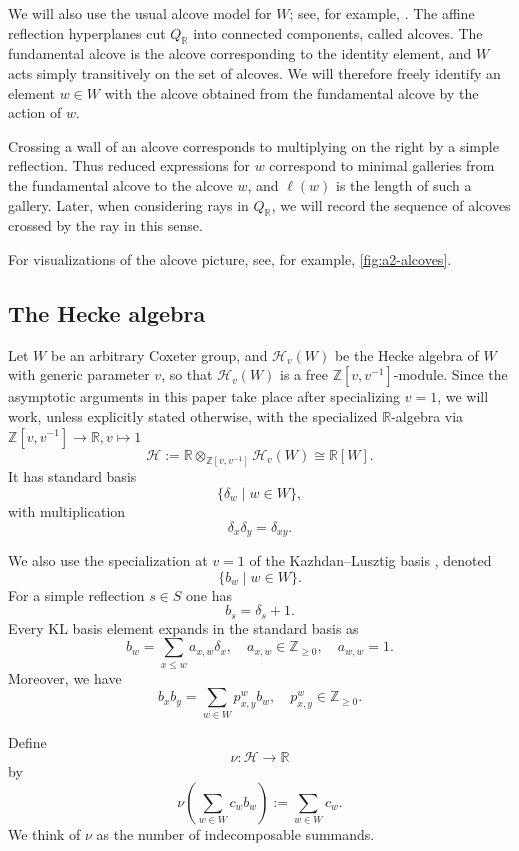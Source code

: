 \documentclass[a4paper,11pt]{amsart}
\newcommand{\R}{\mathbb{R}}
\newcommand{\N}{\mathbb{Z}_{\geq 0}}
\newcommand{\Z}{\mathbb{Z}}
\newcommand{\ra}{\rightarrow}
\newcommand{\Hecke}{\mc H}
\newcommand{\mc}{\mathcal}
\numberwithin{equation}{subsection}
\theoremstyle{definition}
\theoremstyle{remark}
\begin{document}
We will also use the usual alcove model for $W$; see, for example,
\cite[\S 4.3]{Hu-coxeter}. The affine reflection hyperplanes cut
$Q_\R$ into connected components, called alcoves. The fundamental alcove is
the alcove corresponding to the identity element, and $W$ acts simply
transitively on the set of alcoves. We will therefore freely identify an
element $w\in W$ with the alcove obtained from the fundamental alcove by the
action of $w$.

Crossing a wall of an alcove corresponds to multiplying on the right by a
simple reflection. Thus reduced expressions for $w$ correspond to minimal
galleries from the fundamental alcove to the alcove $w$, and $\ell(w)$ is the
length of such a gallery. Later, when considering rays in $Q_\R$, we will
record the sequence of alcoves crossed by the ray in this sense.

\begin{Example}
For visualizations of the alcove picture, see, for example,
\autoref{fig:a2-alcoves}.
\end{Example}

\subsection{The Hecke algebra}\label{secke:Hecke}
Let $W$ be an arbitrary Coxeter group, and $\Hecke_v(W)$ be the Hecke algebra of $W$ with generic parameter $v$, so that $\Hecke_v(W)$ is a free $\Z[v,v^{-1}]$-module.
Since the asymptotic arguments in this paper take place after specializing
$v=1$, we will work, unless explicitly stated otherwise, with the
specialized $\R$-algebra via $\Z[v,v^{-1}]\to\R,v\mapsto 1$
\[
\Hecke:=\R\otimes_{\Z[v,v^{-1}]}\Hecke_v(W)\cong \R [W].
\]
It has standard basis
\[
\{\delta_w\mid w\in W\},
\]
with multiplication
\[
\delta_x\delta_y=\delta_{xy}.
\]

We also use the specialization at $v=1$ of the Kazhdan--Lusztig basis \cite{KaLu-coxeter-hecke},
denoted
\[
\{b_w\mid w\in W\}.
\]
For a simple reflection $s\in S$ one has
\[
b_s=\delta_s+1.
\]
Every KL basis element expands in the standard basis as
\[
b_w=\sum_{x\leq w} a_{x,w}\delta_x,
\quad
a_{x,w}\in\N,
\quad
a_{w,w}=1.
\]
Moreover, we have
\[
b_xb_y=\sum_{w\in W} p_{x,y}^w b_w,\quad p_{x,y}^w\in\N.
\]


\begin{Definition}
Define
\[
\nu\colon \Hecke\ra \R
\]
by
\[
\nu\left(\sum_{w\in W} c_w b_w\right)
:=
\sum_{w\in W} c_w.
\]
We think of $\nu$ as the number of indecomposable summands.
\end{Definition}
\end{document}
